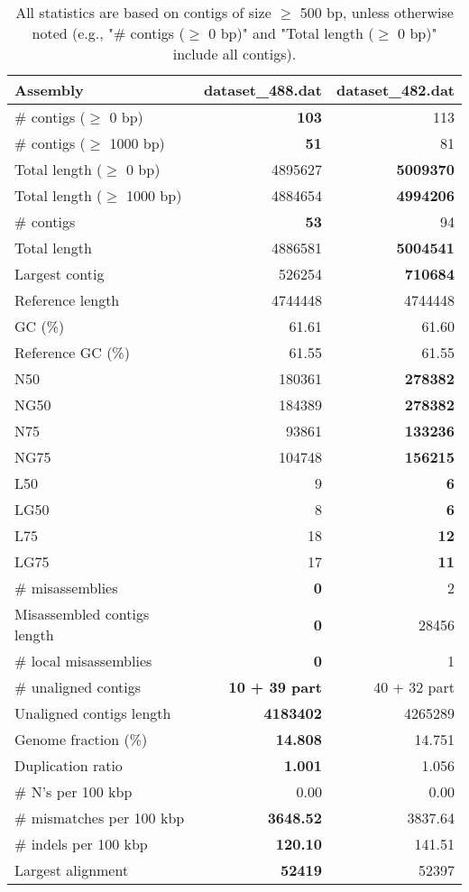 \documentclass[12pt,a4paper]{article}
\begin{document}
\begin{table}[ht]
\begin{center}
\caption{All statistics are based on contigs of size $\geq$ 500 bp, unless otherwise noted (e.g., "\# contigs ($\geq$ 0 bp)" and "Total length ($\geq$ 0 bp)" include all contigs).}
\begin{tabular}{|l*{2}{|r}|}
\hline
Assembly & dataset\_488.dat & dataset\_482.dat \\ \hline
\# contigs ($\geq$ 0 bp) & {\bf 103} & 113 \\ \hline
\# contigs ($\geq$ 1000 bp) & {\bf 51} & 81 \\ \hline
Total length ($\geq$ 0 bp) & 4895627 & {\bf 5009370} \\ \hline
Total length ($\geq$ 1000 bp) & 4884654 & {\bf 4994206} \\ \hline
\# contigs & {\bf 53} & 94 \\ \hline
Total length & 4886581 & {\bf 5004541} \\ \hline
Largest contig & 526254 & {\bf 710684} \\ \hline
Reference length & 4744448 & 4744448 \\ \hline
GC (\%) & 61.61 & 61.60 \\ \hline
Reference GC (\%) & 61.55 & 61.55 \\ \hline
N50 & 180361 & {\bf 278382} \\ \hline
NG50 & 184389 & {\bf 278382} \\ \hline
N75 & 93861 & {\bf 133236} \\ \hline
NG75 & 104748 & {\bf 156215} \\ \hline
L50 & 9 & {\bf 6} \\ \hline
LG50 & 8 & {\bf 6} \\ \hline
L75 & 18 & {\bf 12} \\ \hline
LG75 & 17 & {\bf 11} \\ \hline
\# misassemblies & {\bf 0} & 2 \\ \hline
Misassembled contigs length & {\bf 0} & 28456 \\ \hline
\# local misassemblies & {\bf 0} & 1 \\ \hline
\# unaligned contigs & {\bf 10 + 39 part} & 40 + 32 part \\ \hline
Unaligned contigs length & {\bf 4183402} & 4265289 \\ \hline
Genome fraction (\%) & {\bf 14.808} & 14.751 \\ \hline
Duplication ratio & {\bf 1.001} & 1.056 \\ \hline
\# N's per 100 kbp & 0.00 & 0.00 \\ \hline
\# mismatches per 100 kbp & {\bf 3648.52} & 3837.64 \\ \hline
\# indels per 100 kbp & {\bf 120.10} & 141.51 \\ \hline
Largest alignment & {\bf 52419} & 52397 \\ \hline
\end{tabular}
\end{center}
\end{table}
\end{document}
